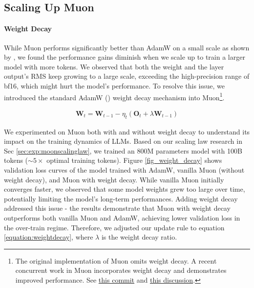 \subsection{Scaling Up Muon}
\label{sec:analysis:rms}

\paragraph{Weight Decay}

While Muon performs significantly better than AdamW on a small scale as shown by \cite{jordan2024muon}, we found the performance gains diminish when we scale up to train a larger model with more tokens. We observed that both the weight and the layer output's RMS keep growing to a large scale, exceeding the high-precision range of bf16, which might hurt the model's performance. To resolve this issue, we introduced the standard AdamW (\cite{loshchilov2018decoupled}) weight decay mechanism into Muon\footnote{The original implementation of Muon omits weight decay. A recent concurrent work in Muon incorporates weight decay and demonstrates improved performance. See \href{https://github.com/KellerJordan/Muon/commit/e0ffefd4f7ea88f2db724caa2c7cfe859155995d}{this commit} and \href{https://x.com/kellerjordan0/status/1888320690543284449}{this discussion}.}. 


\begin{align}
\label{equation:weightdecay}
    \mathbf{W}_t = \mathbf{W}_{t-1} - \eta_t (\mathbf{O}_t + \lambda \mathbf{W}_{t-1})
\end{align}

We experimented on Muon both with and without weight decay to understand its impact on the training dynamics of LLMs. Based on our scaling law research in Sec \ref{sec:exp:moonscalinglaw}, we trained an 800M parameters model with 100B tokens ($\sim5\times$ optimal training tokens). Figure \ref{fig_weight_decay} shows validation loss curves of the model trained with AdamW, vanilla Muon (without weight decay), and Muon with weight decay. While vanilla Muon initially converges faster, we observed that some model weights grew too large over time, potentially limiting the model's long-term performances. Adding weight decay addressed this issue - the results demonstrate that Muon with weight decay outperforms both vanilla Muon and AdamW, achieving lower validation loss in the over-train regime. Therefore, we adjusted our update rule to equation \ref{equation:weightdecay}, where $\lambda$ is the weight decay ratio.


